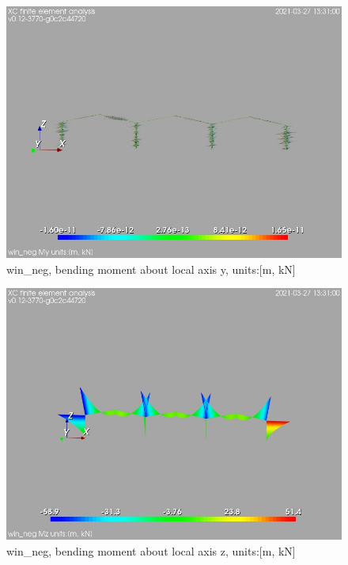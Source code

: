 \begin{figure}
\begin{center}
\includegraphics[width=\linewidth]{calc_results/sole_zeinali/text/graphics/resSimplLC/win_negallMemberSetMy}
\caption{win_neg, bending moment about local axis y, units:[m, kN]}
\end{center}
\end{figure}
\begin{figure}
\begin{center}
\includegraphics[width=\linewidth]{calc_results/sole_zeinali/text/graphics/resSimplLC/win_negallMemberSetMz}
\caption{win_neg, bending moment about local axis z, units:[m, kN]}
\end{center}
\end{figure}
